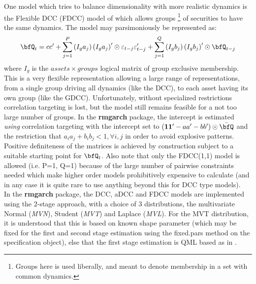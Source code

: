 One model which tries to balance dimensionality with more realistic dynamics is the Flexible DCC (FDCC)
model of \cite{Billio2006} which allows groups \footnote{Groups here is used liberally,
and meant to denote membership in a set with common dynamics.} of securities to have the same
dynamics. The model may parsimoniously be represented as:
\begin{equation}\label{eq:fdcc}
{\bfQ_t} = cc' + \sum\limits_{j = 1}^P {\left( {{I_g}{a_j}} \right){{\left( {{I_g}{a_j}} \right)}^\prime } \odot {\varepsilon _{t - j}}} {\varepsilon '_{t - j}} + \sum\limits_{j = 1}^Q {\left( {{I_g}{b_j}} \right){{\left( {{I_g}{b_j}} \right)}^\prime } \odot {\bfQ_{t - j}}}
\end{equation}
where $I_g$ is the $assets\times groups$ logical matrix of group exclusive membership. This is
a very flexible representation allowing a large range of representations, from a single group
driving all dynamics (like the DCC), to each asset having its own group (like the GDCC).
Unfortunately, without specialized restrictions correlation targeting is lost, but the model
still remains feasible for a not too large number of groups. In the {\bf rmgarch} package,
the intercept is estimated \emph{using} correlation targeting with the intercept set to 
$({\mathbf{11'}} - aa' - bb')\odot \bar \bfQ$ and the restriction that $a_i a_j+b_i b_j<1,\forall i,j$ 
in order to avoid explosive patterns. Positive definiteness of the matrices is achieved by 
construction subject to a suitable starting point for $\bfQ_t$. Also note that only the 
FDCC(1,1) model is allowed (i.e. P=1, Q=1) because of the large number of pairwise constraints
needed which make higher order models prohibitively expensive to calculate (and in any case it is
quite rare to use anything beyond this for DCC type models).\\
In the {\bf rmgarch} package, the DCC, aDCC and FDCC models are implemented using the
2-stage approach, with a choice of 3 distributions, the multivariate Normal (\emph{MVN}),
Student (\emph{MVT}) and Laplace (\emph{MVL}). For the MVT distribution, it is
understood that this is based on known shape parameter (which may be fixed for
the first and second stage estimation using the fixed.pars method on the
specification object), else that the first stage estimation is QML based as in
\cite{Bauwens2005}.\\
